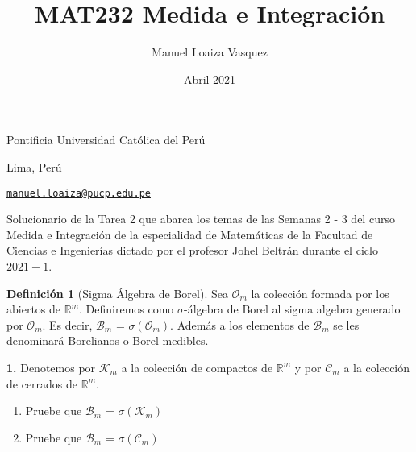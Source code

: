 \documentclass{article}
\title{MAT232 Medida e Integraci\'on}
\author{Manuel Loaiza Vasquez}
\date{Abril 2021}
\newenvironment{statement}[1]{\smallskip\noindent\color[rgb]{1.00,0.00,0.50} {\bf #1.}}{}
\theoremstyle{definition}
\newtheorem{defn}[theorem]{Definici\'on}
\theoremstyle{remark}
\begin{document}
\maketitle

\vspace*{-0.25in}
\centerline{Pontificia Universidad Cat\'olica del Per\'u}
\centerline{Lima, Per\'u}
\centerline{\href{mailto:manuel.loaiza@pucp.edu.pe}{{\tt manuel.loaiza@pucp.edu.pe}}}
\vspace*{0.15in}

\begin{framed}
  Solucionario de la Tarea 2 que abarca los temas de las Semanas 2 - 3 del curso
  Medida e Integraci\'on de la especialidad de Matem\'aticas de la Facultad de
  Ciencias e Ingenier\'ias dictado por el profesor Johel Beltr\'an
  durante el ciclo $2021-1$.
\end{framed}

\begin{defn}[Sigma Álgebra de Borel]
Sea $\mathcal{O}_m$ la colección formada por los abiertos de $\mathbb{R}^m$.
Definiremos como $\sigma$-álgebra de Borel al sigma algebra generado por
$\mathcal{O}_m$. Es decir,  $\mathcal{B}_m$ = $\sigma(\mathcal{O}_m)$.
Además a los elementos de $\mathcal{B}_m$ se les denominará Borelianos o Borel
medibles.
\end{defn}

\begin{statement}{1}
Denotemos por $\mathcal{K}_m$ a la colección de compactos de $\mathbb{R}^m$ y
por $\mathcal{C}_m$ a la colección de cerrados de $\mathbb{R}^m$.
\begin{enumerate}
  \item Pruebe que $\mathcal{B}_m$ = $\sigma(\mathcal{K}_m)$
  \item Pruebe que $\mathcal{B}_m$ = $\sigma(\mathcal{C}_m)$
\end{enumerate}
\end{statement}
\end{document}
